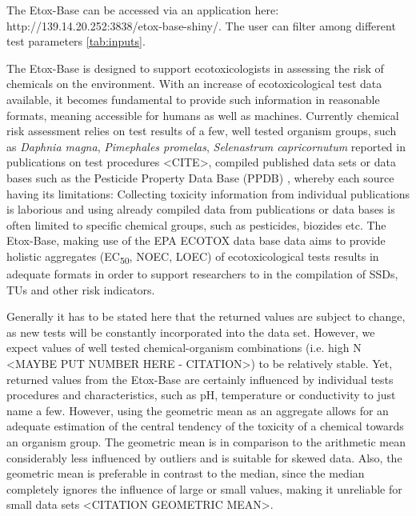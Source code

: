 \documentclass[english]{article}
\newcommand{\etoxbase}{Etox-Base}
\newcommand{\epa}{EPA ECOTOX data base}
\newcommand{\app}{http://139.14.20.252:3838/etox-base-shiny/}
\newcommand{\ecfifty}{EC\textsubscript{50}}
\begin{document}
The \etoxbase{} can be accessed via an application here: \app{}. The user can filter among different test parameters \ref{tab:inputs}.





The \etoxbase{} is designed to support ecotoxicologists in assessing the risk of chemicals on the environment. With an increase of ecotoxicological test data available, it becomes fundamental to provide such information in reasonable formats, meaning accessible for humans as well as machines. Currently chemical risk assessment relies on test results of a few, well tested organism groups, such as \textit{Daphnia magna}, \textit{Pimephales promelas}, \textit{Selenastrum capricornutum} reported in publications on test procedures <CITE>, compiled published data sets \citep{malaj_organic_2014} or data bases such as the Pesticide Property Data Base (PPDB) \citep{lewis_international_2016}, whereby each source having its limitations: Collecting toxicity information from individual publications is laborious and using already compiled data from publications or data bases is often limited to specific chemical groups, such as pesticides, biozides etc. The \etoxbase{}, making use of the \epa{} data aims to provide holistic aggregates (\ecfifty{}, NOEC, LOEC) of ecotoxicological tests results in adequate formats in order to support researchers to in the compilation of SSDs, TUs and other risk indicators.

Generally it has to be stated here that the returned values are subject to change, as new tests will be constantly incorporated into the data set. However, we expect values of well tested chemical-organism combinations (i.e. high N <MAYBE PUT NUMBER HERE - CITATION>) to be relatively stable. Yet, returned values from the \etoxbase{} are certainly influenced by individual tests procedures and characteristics, such as pH, temperature or conductivity to just name a few. However, using the geometric mean as an aggregate allows for an adequate estimation of the central tendency of the toxicity of a chemical towards an organism group. The geometric mean is in comparison to the arithmetic mean considerably less influenced by outliers and is suitable for skewed data. Also, the geometric mean is preferable in contrast to the median, since the median completely ignores the influence of large or small values, making it unreliable for small data sets <CITATION GEOMETRIC MEAN>.
\end{document}
